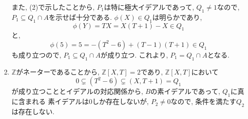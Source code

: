 \documentclass[dvipdfmx]{jsarticle}
\begin{document}
\begin{enumerate}
        また, (2)で示したことから, $P_1$は特に極大イデアルであって, $Q_1 \neq 1$なので,
        $P_1 \subseteq Q_1 \cap A$を示せば十分である.
        $\phi(X) \in Q_1$は明らかであり,
        \[
            \phi(Y) = TX = X(T+1)-X \in Q_1
        \]
        と,
        \[
            \phi(5) = 5 = -(T^2-6) + (T-1)(T+1) \in Q_1
        \]
        も成り立つので, $P_1 \subseteq Q_1 \cap A$が成り立つ.
        これより, $P_1 = Q_1 \cap A$となる.
        \item $\mathbb{Z}$がネーターであることから, $\mathbb{Z}[X, T] = 2$であり,
        $\mathbb{Z}[X, T]$において
        \[
            0 \subsetneq (T^2-6) \subsetneq (X, T+1) = Q_1
        \]
        が成り立つこととイデアルの対応関係から,
        $B$の素イデアルであって, $Q_1$に真に含まれる
        素イデアルは$0$しか存在しないが, $P_2 \neq 0$なので,
        条件を満たす$Q_2$は存在しない.
    \end{enumerate}
\end{document}
